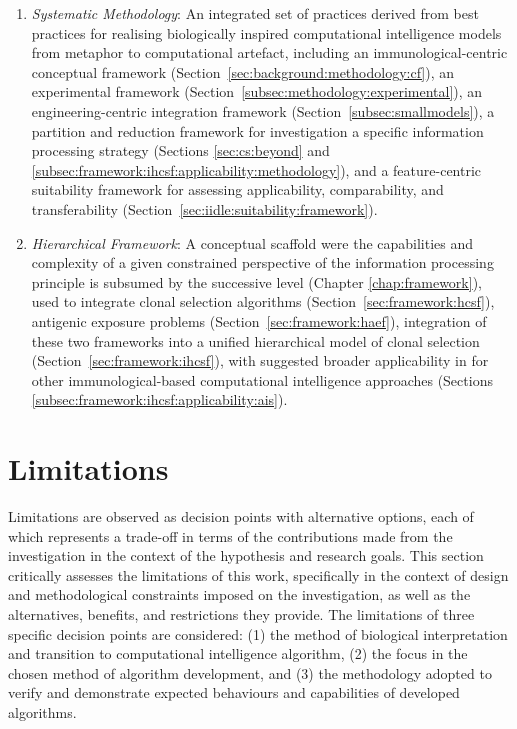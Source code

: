\begin{enumerate}
	\item \emph{Systematic Methodology}: An integrated set of practices derived from best practices for realising biologically inspired computational intelligence models from metaphor to computational artefact, including an immunological-centric conceptual framework (Section~\ref{sec:background:methodology:cf}), an experimental framework (Section~\ref{subsec:methodology:experimental}), an engineering-centric integration framework (Section~\ref{subsec:smallmodels}), a partition and reduction framework for investigation a specific information processing strategy (Sections \ref{sec:cs:beyond} and \ref{subsec:framework:ihcsf:applicability:methodology}), and a feature-centric suitability framework for assessing applicability, comparability, and transferability (Section~\ref{sec:iidle:suitability:framework}).

	
	\item \emph{Hierarchical Framework}: A conceptual scaffold were the capabilities and complexity of a given constrained perspective of the information processing principle is subsumed by the successive level (Chapter \ref{chap:framework}), used to integrate clonal selection algorithms (Section~\ref{sec:framework:hcsf}), antigenic exposure problems (Section~\ref{sec:framework:haef}), integration of these two frameworks into a unified hierarchical model of clonal selection (Section~\ref{sec:framework:ihcsf}), with suggested broader applicability in for other immunological-based computational intelligence approaches (Sections \ref{subsec:framework:ihcsf:applicability:ais}).
	
\end{enumerate}


%
%
\section{Limitations}
\label{sec:conclusions:limitations}
Limitations are observed as decision points with alternative options, each of which represents a trade-off in terms of the contributions made from the investigation in the context of the hypothesis and research goals. This section critically assesses the limitations of this work, specifically in the context of design and methodological constraints imposed on the investigation, as well as the alternatives, benefits, and restrictions they provide. The limitations of three specific decision points are considered: (1) the method of biological interpretation and transition to computational intelligence algorithm, (2) the focus in the chosen method of algorithm development, and (3) the methodology adopted to verify and demonstrate expected behaviours and capabilities of developed algorithms.

